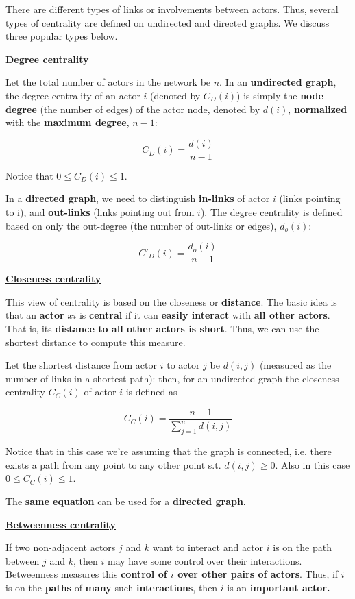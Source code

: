There are different types of links or involvements between actors. Thus, several types of centrality are defined on undirected and directed graphs. We discuss three popular types below.

\underline{\textbf{Degree centrality}}

Let the total number of actors in the network be $n$. In an \textbf{undirected graph}, the degree centrality of an actor $i$ (denoted by $C_D(i)$) is simply the \textbf{node degree} (the number of edges) of the actor node, denoted by $d(i)$, \textbf{normalized} with the \textbf{maximum degree}, $n-1$:

$$
C_D(i) = \frac{d(i)}{n-1}
$$

Notice that $0 \leq C_D(i) \leq 1$.

In a \textbf{directed graph}, we need to distinguish \textbf{in-links} of actor $i$ (links pointing to i), and \textbf{out-links} (links pointing out from $i$). The degree centrality is defined based on only the out-degree (the number of out-links or edges), $d_o(i)$:

$$
C'_D(i) = \frac{d_o(i)}{n-1}
$$

\underline{\textbf{Closeness centrality}}

This view of centrality is based on the closeness or \textbf{distance}. The basic idea is that an \textbf{actor} $xi$ is \textbf{central} if it can \textbf{easily interact} with \textbf{all other actors}. That is, its \textbf{distance to all other actors is short}. Thus, we can use the shortest distance to compute this measure. 

Let the shortest distance from actor $i$ to actor $j$ be $d(i, j)$ (measured as the number of links in a shortest path): then, for an undirected graph the closeness centrality $C_C(i)$ of actor $i$ is defined as 

$$
C_C(i) = \frac{n-1}{\sum_{j = 1}^n d(i,j)}
$$

Notice that in this case we're assuming that the graph is connected, i.e. there exists a path from any point to any other point s.t. $d(i,j) \geq 0$. Also in this case $0 \leq C_C(i) \leq 1$.

The \textbf{same equation} can be used for a \textbf{directed graph}. 

\underline{\textbf{Betweenness centrality}}

If two non-adjacent actors $j$ and $k$ want to interact and actor $i$ is on the path between $j$ and $k$, then $i$ may have some control over their interactions. Betweenness measures this \textbf{control of $i$ over other pairs of actors}. Thus, if $i$ is on the \textbf{paths} of \textbf{many} such \textbf{interactions}, then $i$ is an \textbf{important actor.}

